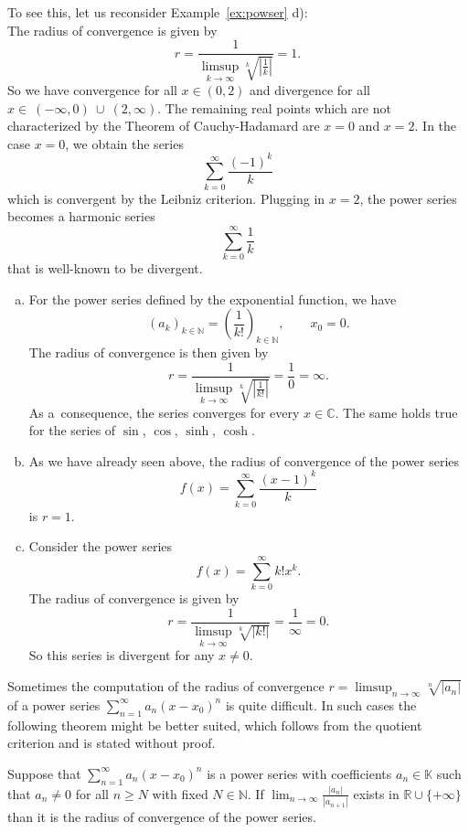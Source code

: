 To see this, let us reconsider Example~\ref{ex:powser} d):\\
The radius of convergence is given by
\[r=\frac{1}{\limsup_{k \rightarrow \infty} \sqrt[k]{|\frac1k|}}=1.\]
So we have convergence for all $x\in(0,2)$ and divergence for all $x\in~(-\infty,0)~\cup~(2,\infty)$. 
The remaining real points which are not characterized by the Theorem of Cauchy-Hadamard are $x=0$ and $x=2$. In the case $x=0$, we obtain the series
\[\sum_{k=0}^\infty \frac{(-1)^k}k\]
which is convergent by the Leibniz criterion. Plugging in $x=2$, the power series becomes a harmonic series
\[\sum_{k=0}^\infty \frac{1}k\]
that is well-known to be divergent.
\begin{example}
\begin{enumerate}[a)]
\item For the power series defined by the exponential function, we have \[(a_k)_{k\in\mathbb{N}}=\left(\frac{1}{k!}\right)_{k\in\mathbb{N}},\qquad x_0=0.\]
The radius of convergence is then given by
\[r=\frac{1}{\limsup_{k\rightarrow\infty} \sqrt[k]{|\frac1{k!}|}}=\frac10=\infty.\]
As a~consequence, the series converges for every $x\in\mathbb{C}$. The same holds true for the series of $\sin$, $\cos$, $\sinh$, $\cosh$.
\item As we have already seen above, the radius of convergence of the power series
\[f(x)=\sum_{k=0}^\infty\frac{(x-1)^k}{k}\]
is $r=1$.
\item Consider the power series
\[f(x)=\sum_{k=0}^\infty k! x^k.\]
The radius of convergence is given by
\[r=\frac{1}{\limsup\limits_{k\rightarrow\infty} \sqrt[k]{|k!|}}=\frac1\infty=0.\]
So this series is divergent for any $x\neq0$.
\end{enumerate}
\end{example} 

Sometimes the computation of the radius of convergence $r=\limsup_{n \rightarrow \infty} \sqrt[n]{|a_n|}$ 
of a power series $\sum_{n=1}^\infty a_n(x-x_0)^n$ is quite difficult. In such cases the following theorem might be better suited, 
which follows from the quotient criterion and is stated without proof. 
\begin{Theorem}{}
\label{thm:qutcrit}
	Suppose that $\sum_{n=1}^\infty a_n(x-x_0)^n$ is a power series with coefficients $a_n\in\mathbb{K}$ such that $a_n\neq 0$ for all $n\geq N$ 
  with fixed $N\in\mathbb{N}$. If $\lim_{n\rightarrow\infty} \frac{|a_n|}{|a_{n+1}|}$ exists in $\mathbb{R}\cup\{+\infty\}$ than it is the
  radius of convergence of the power series.
\end{Theorem}

